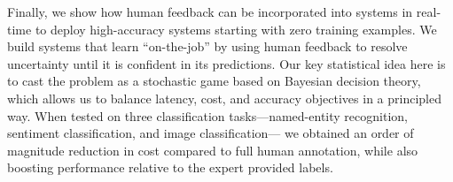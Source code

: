 Finally, we show how human feedback can be incorporated into systems in real-time to deploy high-accuracy systems starting with zero training examples.
We build systems that learn ``on-the-job'' by using human feedback to resolve uncertainty until it is confident in its predictions.
Our key statistical idea here is to cast the problem as a stochastic game based on Bayesian decision theory, which allows us to balance latency, cost, and accuracy objectives in a principled way.
When tested on three classification tasks---named-entity recognition, sentiment classification, and image classification--- we obtained an order of magnitude reduction in cost compared to full human annotation, while also boosting performance relative to the expert provided labels.
